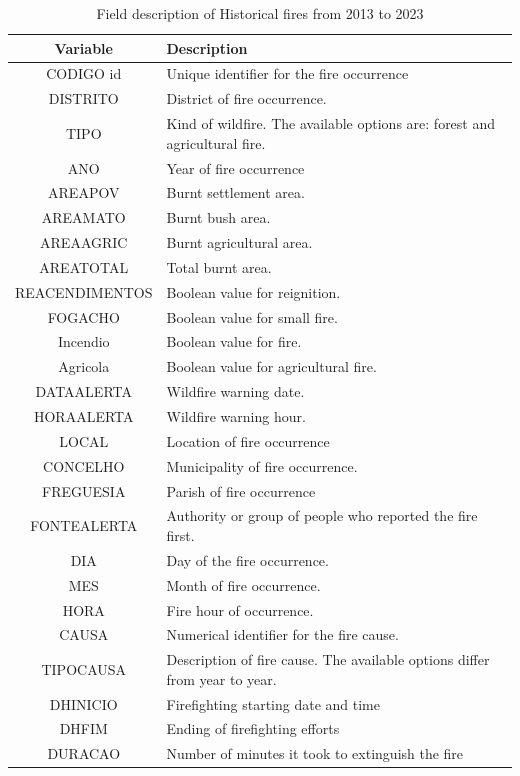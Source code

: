 \begin{table}[H]
	\caption{Field description of Historical fires from 2013 to 2023 \cite{icnf2024}}
	\label{historical_occurrences_2013_2023}
	\centering
	\small
	\begin{tabular}{cp{8.5cm}}
		\hline
		\textbf{Variable} & \textbf{Description}\\
		\hline
		CODIGO id  & Unique identifier for the fire occurrence \\
		DISTRITO  & District of fire occurrence. \\
		TIPO  & Kind of wildfire. The available options are: forest and agricultural fire.\\
		ANO  & Year of fire occurrence \\
		AREAPOV & Burnt settlement area. \\
		AREAMATO & Burnt bush area.  \\
		AREAAGRIC & Burnt agricultural area. \\
		AREATOTAL & Total burnt area. \\
		REACENDIMENTOS & Boolean value for reignition. \\
		FOGACHO & Boolean value for small fire. \\
		Incendio & Boolean value for fire. \\
		Agricola & Boolean value for agricultural fire. \\
		DATAALERTA & Wildfire warning date. \\
		HORAALERTA & Wildfire warning hour. \\
		LOCAL & Location of fire occurrence \\
		CONCELHO & Municipality of fire occurrence. \\
		FREGUESIA & Parish of fire occurrence\\
		FONTEALERTA & Authority or group of people who reported the fire first. \\
		DIA & Day of the fire occurrence. \\
		MES & Month of fire occurrence. \\
		HORA & Fire hour of occurrence. \\
		CAUSA & Numerical identifier for the fire cause. \\
		TIPOCAUSA & Description of fire cause. The available options differ from year to year. \\
		DHINICIO & Firefighting starting date and time \\
		DHFIM & Ending of firefighting efforts\\
		DURACAO & Number of minutes it took to extinguish the fire \\

\end{tabular}
\end{table}

